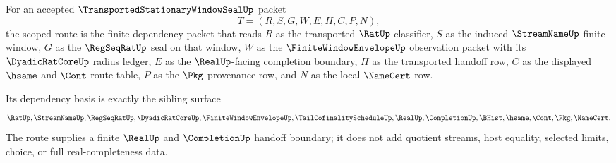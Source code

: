 \begin{definition}
\label{def:transported-stationary-window-seal-scoped-route}
For an accepted $\TransportedStationaryWindowSealUp$ packet
$$
T=(R,S,G,W,E,H,C,P,N),
$$
the scoped route is the finite dependency packet that reads $R$ as the transported $\RatUp$ classifier, $S$ as the induced $\StreamNameUp$ finite window, $G$ as the $\RegSeqRatUp$ seal on that window, $W$ as the $\FiniteWindowEnvelopeUp$ observation packet with its $\DyadicRatCoreUp$ radius ledger, $E$ as the $\RealUp$-facing completion boundary, $H$ as the transported handoff row, $C$ as the displayed $\hsame$ and $\Cont$ route table, $P$ as the $\Pkg$ provenance row, and $N$ as the local $\NameCert$ row.

Its dependency basis is exactly the sibling surface
$$
\begin{aligned}
  \RatUp,\StreamNameUp,\RegSeqRatUp,\DyadicRatCoreUp,\FiniteWindowEnvelopeUp,
  \TailCofinalityScheduleUp,\RealUp,\CompletionUp,
  \BHist,\hsame,\Cont,\Pkg,\NameCert .
\end{aligned}
$$
The route supplies a finite $\RealUp$ and $\CompletionUp$ handoff boundary; it does not add quotient streams, host equality, selected limits, choice, or full real-completeness data.
\end{definition}

